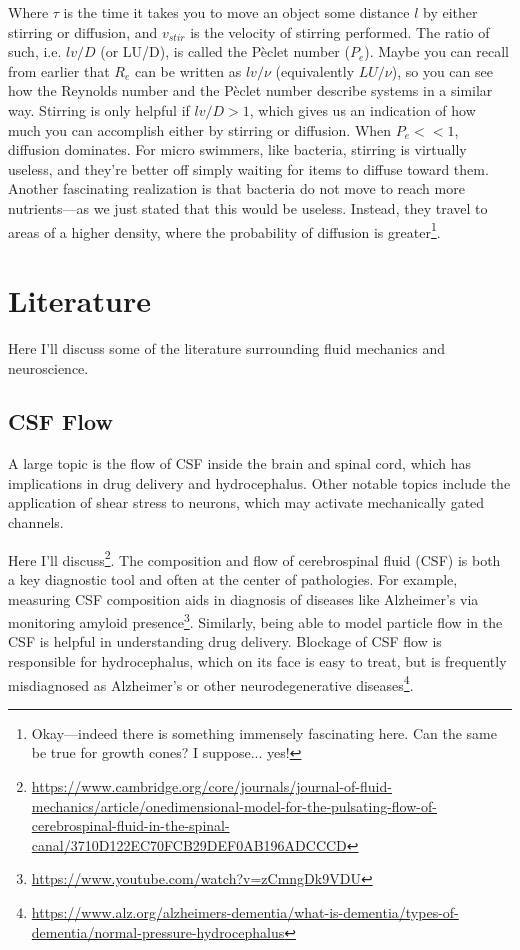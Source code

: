 Where $\tau$ is the time it takes you to move an object some distance $l$ by either stirring or diffusion, and $v_{stir}$ is the velocity of stirring performed. The ratio of such, i.e. $lv / D$ (or LU/D), is called the P\`eclet number ($P_e$). Maybe you can recall from earlier that $R_e$ can be written as $lv / \nu$ (equivalently $LU / \nu$), so you can see how the Reynolds number and the P\`eclet number describe systems in a similar way. Stirring is only helpful if $lv / D > 1$, which gives us an indication of how much you can accomplish either by stirring or diffusion. When $P_e << 1$, diffusion dominates. For micro swimmers, like bacteria, stirring is virtually useless, and they're better off simply waiting for items to diffuse toward them. Another fascinating realization is that bacteria do not move to reach more nutrients---as we just stated that this would be useless. Instead, they travel to areas of a higher density, where the probability of diffusion is greater\footnote{Okay---indeed there is something immensely fascinating here. Can the same be true for growth cones? I suppose... yes!}. 




\section{Literature}

Here I'll discuss some of the literature surrounding fluid mechanics and neuroscience. 

\subsection{CSF Flow}

A large topic is the flow of CSF inside the brain and spinal cord, which has implications in drug delivery and hydrocephalus. Other notable topics include the application of shear stress to neurons, which may activate mechanically gated channels.\newline

Here I'll discuss\footnote{\url{https://www.cambridge.org/core/journals/journal-of-fluid-mechanics/article/onedimensional-model-for-the-pulsating-flow-of-cerebrospinal-fluid-in-the-spinal-canal/3710D122EC70FCB29DEF0AB196ADCCCD}}. The composition and flow of cerebrospinal fluid (CSF) is both a key diagnostic tool and often at the center of pathologies. For example, measuring CSF composition aids in diagnosis of diseases like Alzheimer's via monitoring amyloid presence\footnote{\url{https://www.youtube.com/watch?v=zCmngDk9VDU}}. Similarly, being able to model particle flow in the CSF is helpful in understanding drug delivery. Blockage of CSF flow is responsible for hydrocephalus, which on its face is easy to treat, but is frequently misdiagnosed as Alzheimer's or other neurodegenerative diseases\footnote{\url{https://www.alz.org/alzheimers-dementia/what-is-dementia/types-of-dementia/normal-pressure-hydrocephalus}}.\newline

